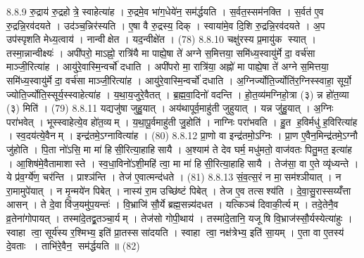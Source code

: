 8.8.9
रु॒द्राय॑ रु॒द्रहोत्रे॒ स्वाहेत्या॑ह । रु॒द्रमे॒व भा॑ग॒धेये॑न॒ सम॑र्द्धयति । स॒र्वत॒स्सम॑नक्ति । स॒र्वत॑ ए॒व रु॒द्रन्नि॒रव॑दयते । उद॑ञ्च॒न्निर॑स्यति । ए॒षा वै रु॒द्रस्य॒ दिक् । स्वाया॑मे॒व दि॒शि रु॒द्रन्नि॒रव॑दयते । अ॒प उप॑स्पृशति मेध्य॒त्वाय॑ । नान्वीक्षेत । यद॒न्वीक्षे॑त । (78)
8.8.10
चक्षु॑रस्य प्र॒मायु॑क स्यात् । तस्मा॒न्नान्वीक्ष्यः॑ । अपी॑परो॒ माऽह्नो॒ रात्रि॑यै मा पाह्ये॒षा ते॑ अग्ने स॒मित्तया॒ समि॑ध्य॒स्वायु॑र्मे दा॒ वर्च॑सा माञ्जी॒रित्या॑ह । आयु॑रे॒वास्मि॒न्वर्चो॑ दधाति । अपी॑परो मा॒ रात्रि॑या॒ अह्नो॑ मा पाह्ये॒षा ते॑ अग्ने स॒मित्तया॒ समि॑ध्य॒स्वायु॑र्मे दा॒ वर्च॑सा माञ्जी॒रित्या॑ह । आयु॑रे॒वास्मि॒न्वर्चो॑ दधाति । अ॒ग्निर्ज्योति॒र्ज्योति॑र॒ग्निस्स्वाहा॒ सूर्यो॒ ज्योति॒र्ज्योति॒स्सूर्य॒स्स्वाहेत्या॑ह । य॒था॒य॒जुरे॒वैतत् । ब्र॒ह्म॒वा॒दिनो॑ वदन्ति । हो॒त॒व्य॑मग्निहो॒त्रा (३) न्न हो॑त॒व्या (३) मिति॑ । (79)
8.8.11
यद्यजु॑षा जुहु॒यात् । अय॑थापूर्व॒माहु॑ती जुहुयात् । यन्न जु॑हु॒यात् । अ॒ग्निः परा॑भवेत् । भूस्स्वाहेत्ये॒व हो॑त॒व्यम् । य॒था॒पू॒र्वमाहु॑ती जु॒होति॑ । नाग्निः परा॑भवति । हु॒त ह॒विर्मधु॑ ह॒विरित्या॑ह । स्व॒दय॑त्ये॒वैनम् । इन्द्र॑तमे॒ऽग्नावित्या॑ह । (80)
8.8.12
प्रा॒णो वा इन्द्र॑तमो॒ऽग्निः । प्रा॒ण ए॒वैन॒मिन्द्र॑तमे॒ऽग्नौ जु॑होति । पि॒ता नो॑ऽसि॒ मा मा॑ हिसी॒रित्या॒हाहिसायै । अ॒श्याम॑ ते देव घर्म॒ मधु॑मतो॒ वाज॑वतः पितु॒मत॒ इत्या॑ह । आ॒शिष॑मे॒वैतामाशास्ते । स्व॒धा॒विनो॑ऽशी॒महि॑ त्वा॒ मा मा॑ हिसी॒रित्या॒हाहिसायै । तेज॑सा॒ वा ए॒ते व्यृ॑ध्यन्ते । ये प्र॑व॒र्ग्ये॑ण॒ चर॑न्ति । प्राश्ञ॑न्ति । तेज॑ ए॒वात्मन्द॑धते । (81)
8.8.13
सं॒व॒त्स॒रं न मा॒सम॑श्ञीयात् । न रा॒मामुपे॑यात् । न मृ॒न्मये॑न पिबेत् । नास्य॑ रा॒म उच्छि॑ष्टं पिबेत् । तेज ए॒व तत्सश्य॑ति । दे॒वा॒सु॒रास्सय्यँ॑त्ता आसन् । ते दे॒वा वि॑ज॒यमु॑प॒यन्तः॑ । वि॒भ्राजि॑ सौ॒र्ये ब्रह्म॒सन्न्य॑दधत । यत्किञ्च॑ दिवाकी॒र्त्यम् । तदे॒तेनै॒व व्र॒तेना॑गोपायत् । तस्मा॑दे॒तद्व्र॒तञ्चा॒र्यम् । तेज॑सो गोपी॒थाय॑ । तस्मा॑दे॒तानि॒ यजूषि वि॒भ्राज॑स्सौ॒र्यस्येत्या॑हुः । स्वाहा त्वा॒ सूर्य॑स्य र॒श्मिभ्य॒ इति॑ प्रा॒तस्ससा॑दयति । स्वाहा त्वा॒ नक्ष॑त्रेभ्य॒ इति॑ सा॒यम् । ए॒ता वा ए॒तस्य॑ दे॒वताः । ताभि॑रे॒वैन॒ सम॑र्द्धयति ॥ (82)
\anuvakamend

